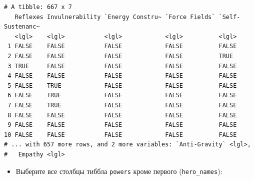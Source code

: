 \documentclass[
]{book}
\newenvironment{Shaded}{\begin{snugshade}}{\end{snugshade}}
\newcommand{\KeywordTok}[1]{\textcolor[rgb]{0.13,0.29,0.53}{\textbf{#1}}}
\newcommand{\NormalTok}[1]{#1}
\newcommand{\OperatorTok}[1]{\textcolor[rgb]{0.81,0.36,0.00}{\textbf{#1}}}
\providecommand{\tightlist}{%
  \setlength{\itemsep}{0pt}\setlength{\parskip}{0pt}}
\begin{document}
\begin{verbatim}
# A tibble: 667 x 7
   Reflexes Invulnerability `Energy Constru~ `Force Fields` `Self-Sustenanc~
   <lgl>    <lgl>           <lgl>            <lgl>          <lgl>           
 1 FALSE    FALSE           FALSE            FALSE          FALSE           
 2 FALSE    FALSE           FALSE            FALSE          TRUE            
 3 TRUE     FALSE           FALSE            FALSE          FALSE           
 4 FALSE    FALSE           FALSE            FALSE          FALSE           
 5 FALSE    TRUE            FALSE            FALSE          FALSE           
 6 FALSE    TRUE            FALSE            FALSE          FALSE           
 7 FALSE    TRUE            FALSE            FALSE          FALSE           
 8 FALSE    FALSE           FALSE            FALSE          FALSE           
 9 FALSE    FALSE           FALSE            FALSE          FALSE           
10 FALSE    FALSE           FALSE            FALSE          FALSE           
# ... with 657 more rows, and 2 more variables: `Anti-Gravity` <lgl>,
#   Empathy <lgl>
\end{verbatim}

\begin{itemize}
\tightlist
\item
  Выберите все столбцы тиббла \texttt{powers} кроме первого (\texttt{hero\_names}):
\end{itemize}

\begin{Shaded}
\end{Shaded}
\end{document}
